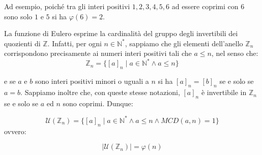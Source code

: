\begin{example}
	Ad esempio, poiché tra gli interi positivi $1,2,3,4,5,6$ ad essere coprimi con $6$ sono solo $1$ e $5$ si ha $\varphi(6)=2$.
\end{example}

La funzione di Eulero esprime la cardinalità del gruppo degli invertibili dei quozienti di $\mathbb{Z}$. Infatti, per ogni $n \in \mathbb{N}^{*}$, sappiamo che gli elementi dell'anello $\mathbb{Z}_{n}$ corrispondono precisamente ai numeri interi positivi tali che $a \leq n$, nel senso che:
\begin{displaymath}
	\mathbb{Z}_{n} = \{[a]_{n} \; | \; a \in \mathbb{N}^{*} \land a \leq n \}
\end{displaymath}

e se $a$ e $b$ sono interi positivi minori o uguali a $n$ si ha $[a]_{n} = [b]_{n}$ se e solo se $a=b$. Sappiamo inoltre che, con queste stesse notazioni, $[a]_{n}$ è invertibile in $\mathbb{Z}_{n}$ se e solo se $a$ ed $n$ sono coprimi. Dunque:

\begin{displaymath}
	\mathcal{U}(\mathbb{Z}_{n}) = \{[a]_{n} \; | \; a \in \mathbb{N}^{*} \land a \leq n \land MCD(a,n) = 1\}
\end{displaymath}
ovvero:

\begin{displaymath}
	|\mathcal{U}(\mathbb{Z}_{n})|=\varphi(n)
\end{displaymath}

